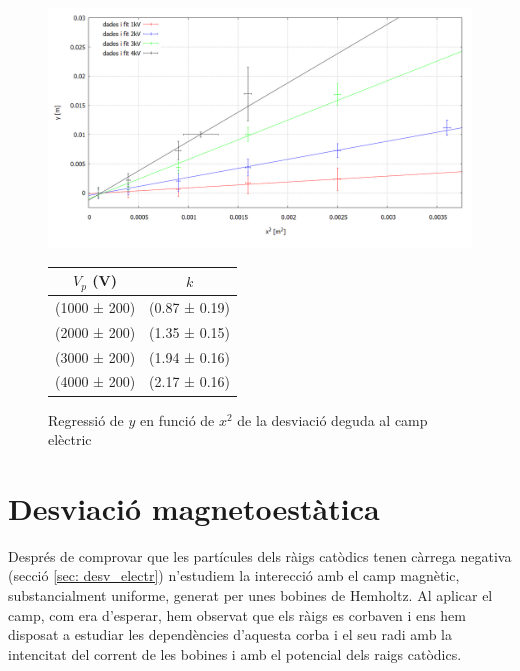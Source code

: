 \documentclass[11pt]{article}
\begin{document}
\begin{figure}[h]
    \centering
    \begin{minipage}{0.45\textwidth}
    \centering
        \includegraphics[width=1\linewidth]{Plot yvsx.PNG}
        \caption{Regressió de $y$ en funció de $x^2$  de la desviació deguda al camp elèctric}
        \label{fig: Regressió Desv E}
    \end{minipage}
    \hfill
    \begin{minipage}{0.45\textwidth} 
        \centering
        \begin{tabular}{|c|c|}
            \hline
            $V_p$ (V)	&	$k$	\\\hline
            (1000 ± 200)	&	(0.87 ± 0.19)   \\\hline
            (2000 ± 200)	&	(1.35 ± 0.15)	\\\hline
            (3000 ± 200)	&	(1.94 ± 0.16)	\\\hline
            (4000 ± 200)	&	(2.17 ± 0.16)	\\\hline           
        \end{tabular}
        \label{tab:kvsVp}
    \end{minipage}
\end{figure}

\section{Desviació magnetoestàtica}\label{sec: desv_magn}
Després de comprovar que les partícules dels ràigs catòdics tenen càrrega negativa (secció \ref{sec: desv_electr}) n'estudiem la interecció amb el camp magnètic, substancialment uniforme, generat per unes bobines de Hemholtz. 
Al aplicar el camp, com era d'esperar, hem observat que els ràigs es corbaven i ens hem disposat a estudiar les dependències d'aquesta corba i el seu radi amb la intencitat del corrent de les bobines i amb el potencial dels raigs catòdics.
\end{document}
